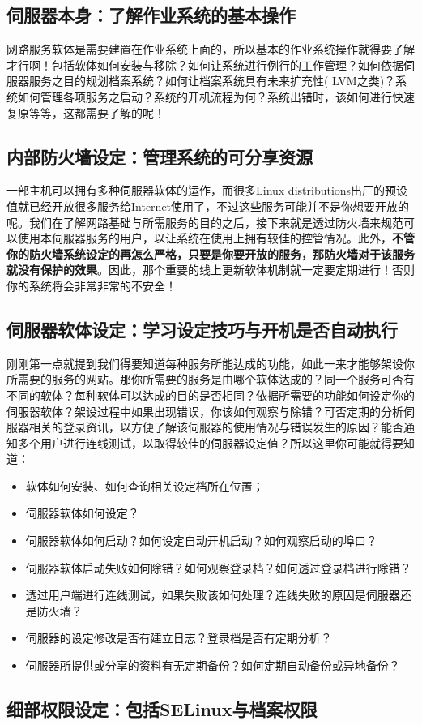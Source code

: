 \documentclass[UTF8,a4paper,12pt]{ctexbook}
\begin{document}
		\subsection{伺服器本身：了解作业系统的基本操作}
			网路服务软体是需要建置在作业系统上面的，所以基本的作业系统操作就得要了解才行啊！包括软体如何安装与移除？如何让系统进行例行的工作管理？如何依据伺服器服务之目的规划档案系统？如何让档案系统具有未来扩充性( LVM之类)？系统如何管理各项服务之启动？系统的开机流程为何？系统出错时，该如何进行快速复原等等，这都需要了解的呢！
			
		\subsection{内部防火墙设定：管理系统的可分享资源}
			一部主机可以拥有多种伺服器软体的运作，而很多Linux distributions出厂的预设值就已经开放很多服务给Internet使用了，不过这些服务可能并不是你想要开放的呢。我们在了解网路基础与所需服务的目的之后，接下来就是透过防火墙来规范可以使用本伺服器服务的用户，以让系统在使用上拥有较佳的控管情况。此外，\textbf{不管你的防火墙系统设定的再怎么严格，只要是你要开放的服务，那防火墙对于该服务就没有保护的效果}。因此，那个重要的线上更新软体机制就一定要定期进行！否则你的系统将会非常非常的不安全！
			
		\subsection{伺服器软体设定：学习设定技巧与开机是否自动执行}
			刚刚第一点就提到我们得要知道每种服务所能达成的功能，如此一来才能够架设你所需要的服务的网站。那你所需要的服务是由哪个软体达成的？同一个服务可否有不同的软体？每种软体可以达成的目的是否相同？依据所需要的功能如何设定你的伺服器软体？架设过程中如果出现错误，你该如何观察与除错？可否定期的分析伺服器相关的登录资讯，以方便了解该伺服器的使用情况与错误发生的原因？能否通知多个用户进行连线测试，以取得较佳的伺服器设定值？所以这里你可能就得要知道：
			\begin{itemize}
				\item 软体如何安装、如何查询相关设定档所在位置；
				\item 伺服器软体如何设定？
				\item 伺服器软体如何启动？如何设定自动开机启动？如何观察启动的埠口？
				\item 伺服器软体启动失败如何除错？如何观察登录档？如何透过登录档进行除错？
				\item 透过用户端进行连线测试，如果失败该如何处理？连线失败的原因是伺服器还是防火墙？
				\item 伺服器的设定修改是否有建立日志？登录档是否有定期分析？
				\item 伺服器所提供或分享的资料有无定期备份？如何定期自动备份或异地备份？
			\end{itemize}	
			
		\subsection{细部权限设定：包括SELinux与档案权限}	
		
\end{document}
